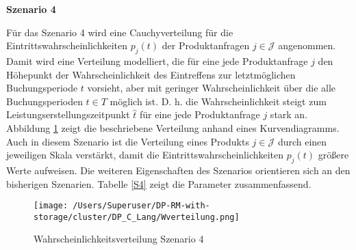 \newpage

\textbf{Szenario 4}

Für das Szenario 4 wird eine Cauchyverteilung für die Eintrittswahrscheinlichkeiten $p_j(t)$ der Produktanfragen $j\in\mathcal{J}$ angenommen. Damit wird eine Verteilung modelliert, die für eine jede Produktanfrage $j$ den Höhepunkt der Wahrscheinlichkeit des Eintreffens zur letztmöglichen Buchungsperiode $t$ vorsieht, aber mit geringer Wahrscheinlichkeit über die alle Buchungsperioden $t\in T$ möglich ist. D. h. die Wahrscheinlichkeit steigt zum Leistungserstellungszeitpunkt $\hat t$ für eine jede Produktanfrage $j$ stark an. Abbildung \ref{SB4} zeigt die beschriebene Verteilung anhand eines Kurvendiagramms. Auch in diesem Szenario ist die Verteilung eines Produkts $j\in\mathcal{J}$ durch einen jeweiligen Skala verstärkt, damit die Eintrittswahrscheinlichkeiten $p_j(t)$ größere Werte aufweisen. Die weiteren Eigenschaften des Szenarios orientieren sich an den bisherigen Szenarien. Tabelle \ref{S4} zeigt die Parameter zusammenfassend.

\begin{figure}[h!]
  \begin{center}
    \texttt{[image: /Users/Superuser/DP-RM-with-storage/cluster/DP\_C\_Lang/Wverteilung.png]}
    \caption{Wahrscheinlichkeitsverteilung Szenario 4}  \label{SB4}
  \end{center}
\end{figure}

